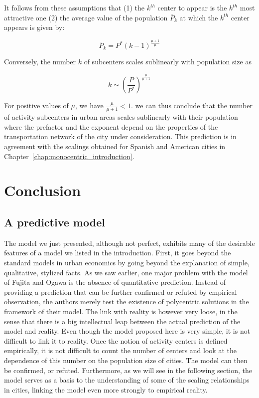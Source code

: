It follows from these assumptions that (1) the $k^{th}$ center to appear is the
$k^{th}$ most attractive one (2) the average value of the population
$\overline{P}_k$ at which the $k^{th}$ center appears is given by:

\begin{equation} 
    \overline{P}_k = P^* \left( k-1 \right)^{\frac{\mu+1}{\mu}}
\end{equation}

Conversely, the number $k$ of subcenters scales sublinearly with population size as

\begin{equation} 
    \boxed{k \sim \left( \frac{P}{P^*} \right)^{\frac{\mu}{\mu
    + 1}}}
    \label{eq:centers_prediction}
\end{equation} 

For positive values of $\mu$, we have $\frac{\mu}{\mu+1}<1$. we can thus
conclude that the number of activity subcenters in urban areas scales sublinearly
with their population where the prefactor and the exponent depend on the
properties of the transportation network of the city under consideration. This
prediction is in agreement with the scalings obtained for Spanish and American
cities in Chapter~\ref{chap:monocentric_introduction}.



\section{Conclusion}
\label{sec:conclusion}

\subsection{A predictive model}
\label{sub:a_predictive_mode}

The model we just presented, although not perfect, exhibits many of the
desirable features of a model we listed in the introduction. First, it goes
beyond the standard models in urban economics by going beyond the explanation of
simple, qualitative, stylized facts. As we saw earlier, one major problem with the model of Fujita
and Ogawa is the absence of quantitative prediction. Instead of providing a
prediction that can be further confirmed or refuted by empirical observation,
the authors merely test the existence of polycentric solutions in the
framework of their model. The link with reality is however very loose, in the
sense that there is a big intellectual leap between the actual prediction of the
model and reality. Even though the model proposed here is very simple, it is not
difficult to link it to reality. Once the notion of activity centers is defined
empirically, it is not difficult to count the number of centers and look at the
dependence of this number on the population size of cities. The
model can then be confirmed, or refuted. Furthermore, as we will see in the
following section, the model serves as a basis to the understanding of some of
the scaling relationships in cities, linking the model even more strongly to 
empirical reality.

